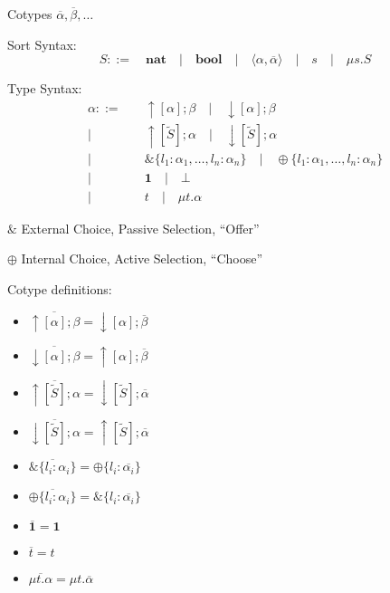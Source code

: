 Cotypes $\overline{\alpha}, \overline{\beta}, \ldots$ %

Sort Syntax:
\cite{honda-vasconcelos-kubo98}
\[
  S ::= \quad \mathbf{nat} \quad
      | \quad \mathbf{bool} \quad
      | \quad \langle \alpha, \overline{\alpha} \rangle \quad
      | \quad s \quad
      | \quad \mu s.S
\]

Type Syntax:
\cite{honda-vasconcelos-kubo98}
\[
\begin{split}
  \alpha  ::=&\quad \uparrow[\alpha]; \beta \quad
            | \quad \downarrow[\alpha]; \beta \\
            |&\quad \uparrow[\tilde{S}]; \alpha \quad
            | \quad \downarrow[\tilde{S}]; \alpha \\
            |&\quad \& \{ l_1 : \alpha_1, \ldots, l_n : \alpha_n \} \quad
            | \quad \oplus \{ l_1 : \alpha_1, \ldots, l_n : \alpha_n \} \\
            |&\quad \mathbf{1} \quad
            | \quad \bot \quad \\
            |&\quad t \quad
            | \quad \mu t.\alpha
\end{split}
\]

$\&$ External Choice, Passive Selection, ``Offer''

$\oplus$ Internal Choice, Active Selection, ``Choose''


Cotype definitions:
\cite{honda-vasconcelos-kubo98}
\begin{itemize}
  \item $\overline{\uparrow[\alpha]; \beta}
    = \downarrow[\alpha]; \overline{\beta}$
  \item $\overline{\downarrow[\alpha]; \beta}
    = \uparrow[\alpha]; \overline{\beta}$
  \item $\overline{\uparrow[\tilde{S}]; \alpha}
    = \downarrow[\tilde{S}]; \overline{\alpha}$
  \item $\overline{\downarrow[\tilde{S}]; \alpha}
    = \uparrow[\tilde{S}]; \overline{\alpha}$
  \item $\overline{\& \{ l_i : \alpha_i \}}
    = \oplus \{ l_i : \overline{\alpha_i} \}$
  \item $\overline{\oplus \{ l_i : \alpha_i \}}
    = \& \{ l_i : \overline{\alpha_i} \}$
  \item $\overline{\mathbf{1}} = \mathbf{1}$
  \item $\overline{t} = t$
  \item $\overline{\mu t.\alpha} = \mu t.\overline{\alpha}$
\end{itemize}


